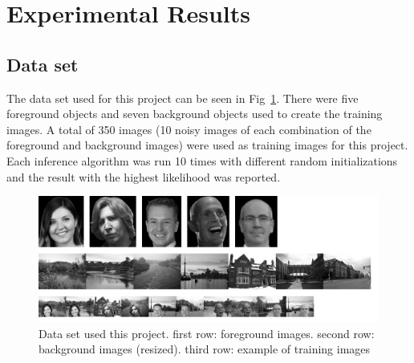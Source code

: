 \documentclass{article} %
\begin{document}
\section{Experimental Results}
\label{result}
\subsection{Data set}
\label{data_set}
The data set used for this project can be seen in Fig~\ref{fig:data_set}. There were five foreground objects and seven background objects used to create the training images.  A total of 350 images (10 noisy images of each combination of the foreground and background images) were used as training images for this project. Each inference algorithm was run 10 times with different random initializations and the result with the highest likelihood was reported.

\begin{figure}[h]
\begin{center}
\includegraphics[width=1\textwidth]{data_set}
\end{center}
\caption{Data set used this project. first row: foreground images. second row: background images (resized). third row: example of training images}
\label{fig:data_set}
\end{figure}
\end{document}
